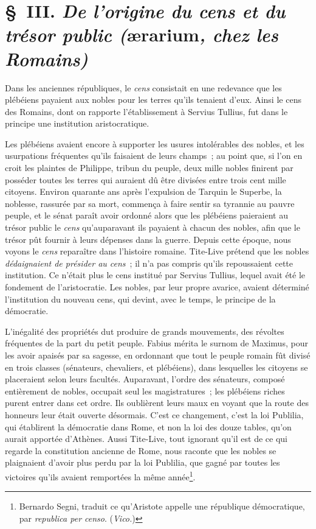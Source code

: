 \documentclass[french,twoside]{book} %
\begin{document}
\section[{§ III. De l’origine du cens et du trésor public (ærarium, chez les Romains)}]{§ III. {\itshape De l’origine du cens et du trésor public (}ærarium{\itshape , chez les Romains)}}
\noindent  Dans les anciennes républiques, le {\itshape cens} consistait en une redevance que les plébéiens payaient aux nobles pour les terres qu’ils tenaient d’eux. Ainsi le cens des Romains, dont on rapporte l’établissement à Servius Tullius, fut dans le principe une institution aristocratique.\par
Les plébéiens avaient encore à supporter les usures intolérables des nobles, et les usurpations fréquentes qu’ils faisaient de leurs champs ; au point que, si l’on en croit les plaintes de Philippe, tribun du peuple, deux mille nobles finirent par posséder toutes les terres qui auraient dû être divisées entre trois cent mille citoyens. Environ quarante ans après l’expulsion de Tarquin le Superbe, la noblesse, rassurée par sa mort, commença à faire sentir sa tyrannie au pauvre peuple, et le sénat paraît avoir ordonné alors que les plébéiens paieraient au trésor public le {\itshape cens} qu’auparavant ils payaient à chacun des nobles, afin que le trésor pût fournir à leurs dépenses dans la guerre. Depuis cette époque, nous voyons le {\itshape cens} reparaître dans l’histoire romaine. Tite-Live prétend que les nobles \emph{{\itshape dédaignaient de présider au cens}} ; il n’a pas compris qu’ils repoussaient cette institution. Ce n’était plus le cens institué par Servius Tullius, lequel avait été le fondement de l’aristocratie. Les nobles, par leur propre  avarice, avaient déterminé l’institution du nouveau cens, qui devint, avec le temps, le principe de la démocratie.\par
L’inégalité des propriétés dut produire de grands mouvements, des révoltes fréquentes de la part du petit peuple. Fabius mérita le surnom de Maximus, pour les avoir apaisés par sa sagesse, en ordonnant que tout le peuple romain fût divisé en trois classes (sénateurs, chevaliers, et plébéiens), dans lesquelles les citoyens se placeraient selon leurs facultés. Auparavant, l’ordre des sénateurs, composé entièrement de nobles, occupait seul les magistratures ; les plébéiens riches purent entrer dans cet ordre. Ils oublièrent leurs maux en voyant que la route des honneurs leur était ouverte désormais. C’est ce changement, c’est la loi Publilia, qui établirent la démocratie dans Rome, et non la loi des douze tables, qu’on aurait apportée d’Athènes. Aussi Tite-Live, tout ignorant qu’il est de ce qui regarde la constitution ancienne de Rome, nous raconte que les nobles se plaignaient d’avoir plus perdu par la loi Publilia, que gagné par toutes les victoires qu’ils avaient remportées la même année\footnote{Bernardo Segni, traduit ce qu’Aristote appelle une république démocratique, par \emph{{\itshape republica per censo}}. ({\itshape Vico.})}.\par
\end{document}
